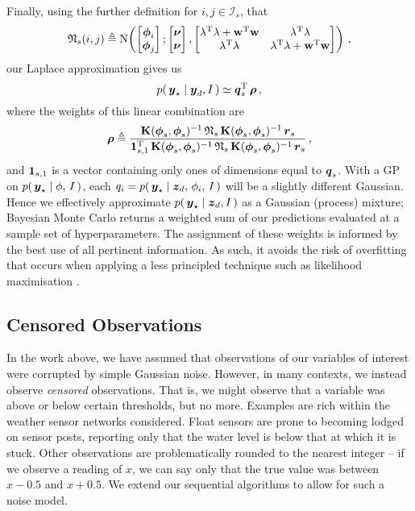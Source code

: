\documentclass{acmtrans2m}
\begin{document}
Finally, using the further definition for $i,j \in \mathcal{I}_s$, that
\begin{equation}
\mathbf{\mathfrak{N}}_s(i,j) \triangleq \text{N}\!\left(\begin{bmatrix} \boldsymbol{\phi}_i \\ \boldsymbol{\phi}_j \end{bmatrix};\begin{bmatrix} \boldsymbol{\nu} \\ \boldsymbol{\nu} \end{bmatrix},\begin{bmatrix}  \mathbf{\lambda}^{\mathrm{T}} \mathbf{\lambda}+\mathbf{w}^{\mathrm{T}} \mathbf{w} & \mathbf{\lambda}^{\mathrm{T}} \mathbf{\lambda} \\ \mathbf{\lambda}^{\mathrm{T}} \mathbf{\lambda} & \mathbf{\lambda}^{\mathrm{T}} \mathbf{\lambda}+\mathbf{w}^{\mathrm{T}} \mathbf{w}
\end{bmatrix}\right)\,,
\end{equation}
our Laplace approximation gives us
\begin{equation} \label{eq:muPsi}
p\!\left(\,\boldsymbol{y}_\star\mid\boldsymbol{y}_d,I\,\right) \simeq \boldsymbol{q}_s^{\mathrm{T}}\,\boldsymbol{\rho}\,,
\end{equation}
where the weights of this linear combination are
\begin{equation} \label{eq:weights}
\boldsymbol{\rho}\triangleq\frac{\mathbf{K}(\boldsymbol{\phi}_s,\boldsymbol{\phi}_s)^{-1}\,\mathbf{\mathfrak{N}}_s\,\mathbf{K}(\boldsymbol{\phi}_s,\boldsymbol{\phi}_s)^{-1}\,\boldsymbol{r}_s}
{\mathbf{1}_{s,1}^{\mathrm{T}}\,\mathbf{K}(\boldsymbol{\phi}_s,\boldsymbol{\phi}_s)^{-1}\,\mathbf{\mathfrak{N}}_s\,\mathbf{K}(\boldsymbol{\phi}_s,\boldsymbol{\phi}_s)^{-1}\,\boldsymbol{r}_s}\,,
\end{equation}
and $\mathbf{1}_{s,1}$ is a vector containing only ones of dimensions equal to $\boldsymbol{q}_s$. With a GP on 
$p\!\left(\,\boldsymbol{y}_\star\mid\phi,\,I\,\right)$, each $q_i = p\!\left(\,\boldsymbol{y}_\star\mid\boldsymbol{z}_d,\,\phi_i,\,I\,\right)$ will be a slightly different Gaussian. Hence we effectively approximate $p\!\left(\,\boldsymbol{y}_\star\mid\boldsymbol{z}_d,I\,\right)$ as a Gaussian (process) mixture; Bayesian Monte Carlo returns a weighted sum of our predictions evaluated at a sample set of hyperparameters. The assignment of these weights is informed by the best use of all pertinent information. As such, it avoids the risk of overfitting that occurs when applying a less principled technique such as likelihood maximisation \cite{MKBook}.

\subsection{Censored Observations}

In the work above, we have assumed that observations of our variables of interest were corrupted by simple Gaussian noise. However, in many contexts, we instead observe \emph{censored} observations. That is, we might observe that a variable was above or below certain thresholds, but no more. Examples are rich within the weather sensor networks considered. Float sensors are prone to becoming lodged on sensor posts, reporting only that the water level is below that at which it is stuck. Other observations are problematically rounded to the nearest integer -- if we observe a reading of $x$, we can say only that the true value was between $x-0.5$ and $x+0.5$. We extend our sequential algorithms to allow for such a noise model. 
\end{document}
